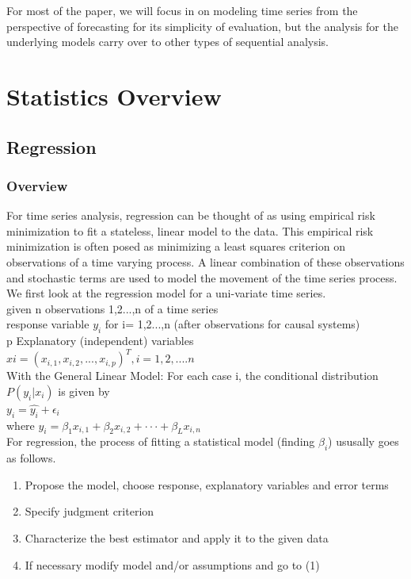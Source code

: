 \documentclass{article}
\begin{document}
\noindent For most of the paper, we will focus in on modeling time series from the perspective of forecasting for its simplicity of evaluation, but the analysis for the underlying models carry over to other types of sequential analysis.

\section{Statistics Overview}

\subsection{Regression}
\subsubsection{Overview}
For time series analysis, regression can be thought of as using empirical risk minimization to fit a stateless, linear model to the data. This empirical risk minimization is often posed as minimizing a least squares criterion on observations of a time varying process. A linear combination of these observations and stochastic terms are used to model the movement of the time series process.
We first look at the regression model for a uni-variate time series.\\

  \indent given n observations 1,2...,n of a time series\\
  \indent response variable $y_i$  for i= 1,2...,n (after observations for causal systems)\\
  
  \indent p Explanatory (independent) variables \\
  \indent $xi = (x_{i,1}, x_{i,2}, . . . , x_{i,p})^T, i = 1,2,....n$ \\

\noindent With the General Linear Model: For each case i, the conditional distribution $P(y_i|x_i)$ is given by\\

  \indent $y_i = \hat{y_i} + \epsilon_i$\\
  \indent where $\hat{y_i} =  \beta_1x_{i,1} + \beta_2x_{i,2} + · · · + \beta_Lx_{i,n}$\\

\noindent For regression, the process of fitting a statistical model (finding $\beta_i$) ususally goes as follows.
\begin{enumerate}
  \item Propose the model, choose response, explanatory variables and error terms
  \item Specify judgment criterion
  \item Characterize the best estimator and apply it to the given data
  \item If necessary modify model and/or assumptions and go to (1)
\end{enumerate}
\end{document}
